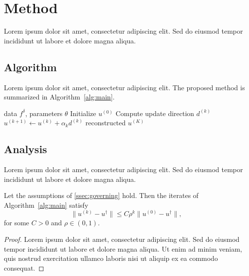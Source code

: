 \section{Method}\label{sec:method}


Lorem ipsum dolor sit amet, consectetur adipiscing elit. Sed do eiusmod tempor
incididunt ut labore et dolore magna aliqua.

\subsection{Algorithm}\label{ssec:algorithm}

Lorem ipsum dolor sit amet, consectetur adipiscing elit. The proposed method is
summarized in Algorithm~\ref{alg:main}.

\begin{algorithm}[!htb]
    \caption{Proposed Method}\label{alg:main}
    \begin{algorithmic}[1]
        \Require data $f^\delta$, parameters $\theta$
        \State Initialize $u^{(0)}$
            \State Compute update direction $d^{(k)}$
            \State $u^{(k+1)} \gets u^{(k)} + \alpha_k d^{(k)}$
        \EndFor
        \Ensure reconstructed $u^{(K)}$
    \end{algorithmic}
\end{algorithm}

\subsection{Analysis}\label{ssec:analysis}

Lorem ipsum dolor sit amet, consectetur adipiscing elit. Sed do eiusmod tempor
incididunt ut labore et dolore magna aliqua.

\begin{theorem}\label{thm:main}
    Let the assumptions of \cref{ssec:governing} hold. Then the iterates of
    Algorithm~\ref{alg:main} satisfy
    \begin{equation}\label{eq:bound}
        \|u^{(k)} - u^\dagger\| \le C \rho^k \|u^{(0)} - u^\dagger\|,
    \end{equation}
    for some $C>0$ and $\rho\in(0,1)$.
\end{theorem}

\begin{proof}
    Lorem ipsum dolor sit amet, consectetur adipiscing elit. Sed do eiusmod tempor
    incididunt ut labore et dolore magna aliqua. Ut enim ad minim veniam, quis
    nostrud exercitation ullamco laboris nisi ut aliquip ex ea commodo consequat.
\end{proof}

